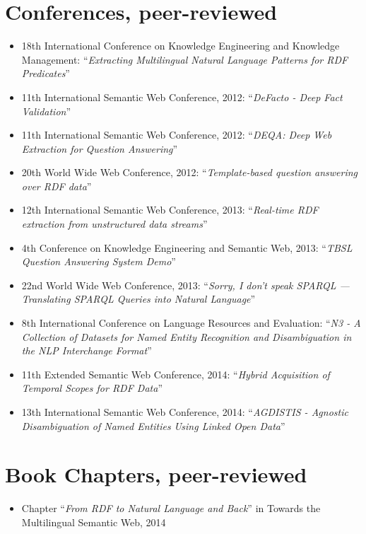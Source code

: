 \section*{Conferences, peer-reviewed}
\begin{itemize}
    \item 18th International Conference on Knowledge Engineering and Knowledge Management: ``\textit{Extracting Multilingual Natural Language Patterns for RDF Predicates}'' \citep{conf/ekaw/GerberN12}
    \item 11th International Semantic Web Conference, 2012: ``\textit{DeFacto - Deep Fact Validation}'' \citep{LEH+12a}
    \item 11th International Semantic Web Conference, 2012: ``\textit{DEQA: Deep Web Extraction for Question Answering}'' \citep{LEH+12b}
    \item 20th World Wide Web Conference, 2012: ``\textit{Template-based question answering over RDF data}'' \citep{unger2012template}
    \item 12th International Semantic Web Conference, 2013: ``\textit{Real-time RDF extraction from unstructured data streams}'' \citep{Gerber13b}
    \item 4th Conference on Knowledge Engineering and Semantic Web, 2013: ``\textit{TBSL Question Answering System Demo}'' \citep{hoeffner-2013-kesw}
    \item 22nd World Wide Web Conference, 2013: ``\textit{Sorry, I don't speak SPARQL --- Translating SPARQL Queries into Natural Language}'' \citep{NGO+13a,sparql2nl-demo}
    \item 8th International Conference on Language Resources and Evaluation: ``\textit{N3 - A Collection of Datasets for Named Entity Recognition and Disambiguation in the NLP Interchange Format}'' \citep{N3}
    \item 11th Extended Semantic Web Conference, 2014: ``\textit{Hybrid Acquisition of Temporal Scopes for RDF Data}'' \citep{Rula14}
    \item 13th International Semantic Web Conference, 2014:  ``\textit{AGDISTIS - Agnostic Disambiguation of Named Entities Using Linked Open Data}'' \citep{Usbeck2013AGDISTIS}   
\end{itemize}

\section*{Book Chapters, peer-reviewed}
\begin{itemize}
    \item Chapter ``\textit{From RDF to Natural Language and Back}'' in Towards the Multilingual Semantic Web, 2014 \citep{Gerber13}
\end{itemize}

